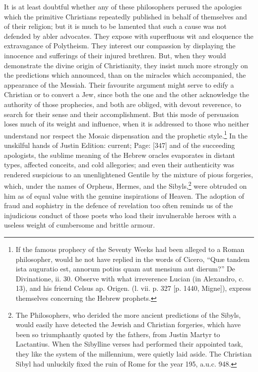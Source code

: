 It is at least doubtful whether any of these philosophers perused the apologies which the primitive Christians repeatedly published in behalf of themselves and of their religion; but it is much to be lamented that such a cause was not defended by abler advocates. They expose with superfluous wit and eloquence the extravagance of Polytheism. They interest our compassion by displaying the innocence and sufferings of their injured brethren. But, when they would demonstrate the divine origin of Christianity, they insist much more strongly on the predictions which announced, than on the miracles which accompanied, the appearance of the Messiah. Their favourite argument might serve to edify a Christian or to convert a Jew, since both the one and the other acknowledge the authority of those prophecies, and both are obliged, with devout reverence, to search for their sense and their accomplishment. But this mode of persuasion loses much of its weight and influence, when it is addressed to those who neither understand nor respect the Mosaic dispensation and the prophetic style.\footnote{If the famous prophecy of the Seventy Weeks had been alleged to a Roman philosopher, would he not have replied in the words of Cicero, \texthebrew{“}Quæ tandem ista auguratio est, annorum potius quam aut mensium aut dierum?\texthebrew{}” De Divinatione, ii. 30. Observe with what irreverence Lucian (in Alexandro, c. 13), and his friend Celsus ap. Origen. (l. vii. p. 327 [p. 1440, Migne]), express themselves concerning the Hebrew prophets.} In the unskilful hands of Justin Edition: current; Page: [347] and of the succeeding apologists, the sublime meaning of the Hebrew oracles evaporates in distant types, affected conceits, and cold allegories; and even their authenticity was rendered suspicious to an unenlightened Gentile by the mixture of pious forgeries, which, under the names of Orpheus, Hermes, and the Sibyls,\footnote{The Philosophers, who derided the more ancient predictions of the Sibyls, would easily have detected the Jewish and Christian forgeries, which have been so triumphantly quoted by the fathers, from Justin Martyr to Lactantius. When the Sibylline verses had performed their appointed task, they like the system of the millennium, were quietly laid aside. The Christian Sibyl had unluckily fixed the ruin of Rome for the year 195, a.u.c. 948.} were obtruded on him as of equal value with the genuine inspirations of Heaven. The adoption of fraud and sophistry in the defence of revelation too often reminds us of the injudicious conduct of those poets who load their invulnerable heroes with a useless weight of cumbersome and brittle armour.

